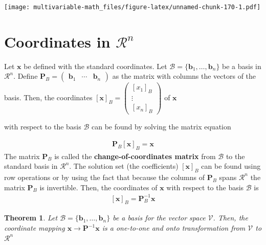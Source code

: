 \documentclass[
]{book}
\newtheorem{theorem}{Theorem}[chapter]
\theoremstyle{definition}
\theoremstyle{definition}
\theoremstyle{definition}
\theoremstyle{definition}
\theoremstyle{remark}
\begin{document}
\texttt{[image: multivariable-math\_files/figure-latex/unnamed-chunk-170-1.pdf]}

\hypertarget{coordinates-in-mathcalrn}{%
\section{\texorpdfstring{Coordinates in \(\mathcal{R}^n\)}{Coordinates in \textbackslash mathcal\{R\}\^{}n}}\label{coordinates-in-mathcalrn}}

Let \(\mathbf{x}\) be defined with the standard coordinates. Let \(\mathcal{B} = \{ \mathbf{b}_1, \ldots, \mathbf{b}_n \}\) be a basis in \(\mathcal{R}^n\). Define \(\mathbf{P}_B = \begin{pmatrix} \mathbf{b}_1 & \cdots & \mathbf{b}_n \end{pmatrix}\) as the matrix with columns the vectors of the basis. Then, the coordinates \(\left[\mathbf{x}\right]_B = \begin{pmatrix} [x_1]_B \\ \vdots \\ [x_n]_B \end{pmatrix}\) of \(\mathbf{x}\)

with respect to the basis \(\mathcal{B}\) can be found by solving the matrix equation

\[
\begin{aligned}
\mathbf{P}_B \left[\mathbf{x}\right]_B = \mathbf{x}
\end{aligned}
\]
The matrix \(\mathbf{P}_B\) is called the \textbf{change-of-coordinates matrix} from \(\mathcal{B}\) to the standard basis in \(\mathcal{R}^n\). The solution set (the coefficients) \(\left[\mathbf{x}\right]_B\) can be found using row operations or by using the fact that because the columns of \(\mathbf{P}_B\) spans \(\mathcal{R}^n\) the matrix \(\mathbf{P}_B\) is invertible. Then, the coordinates of \(\mathbf{x}\) with respect to the basis \(\mathcal{B}\) is
\[
\begin{aligned}
\left[\mathbf{x}\right]_B = \mathbf{P}_B^{-1} \mathbf{x}
\end{aligned}
\]

\begin{theorem}
Let \(\mathcal{B} = \{ \mathbf{b}_1, \ldots, \mathbf{b}_n\}\) be a basis for the vector space \(\mathcal{V}\). Then, the coordinate mapping \(\mathbf{x} \rightarrow \mathbf{P}^{-1} \mathbf{x}\) is a one-to-one and onto transformation from \(\mathcal{V}\) to \(\mathcal{R}^n\)
\end{theorem}
\end{document}
